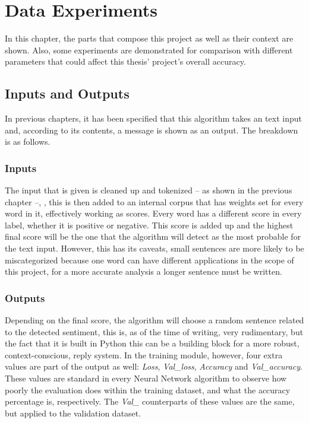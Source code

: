 \chapter{Data Experiments}
In this chapter, the parts that compose this project as well as their context are shown. Also, some experiments are demonstrated for comparison with different parameters that could affect this thesis' project's overall accuracy.

\section{Inputs and Outputs}
In previous chapters, it has been specified that this algorithm takes an text input and, according to its contents, a message is shown as an output. The breakdown is as follows.
\subsection{Inputs}
The input that is given is cleaned up and tokenized -- as shown in the previous chapter --, , this is then added to an internal corpus that has weights set for every word in it, effectively working as scores. Every word has a different score in every label, whether it is positive or negative. This score is added up and the highest final score will be the one that the algorithm will detect as the most probable for the text input. However, this has its caveats, small sentences are more likely to be miscategorized because one word can have different applications in the scope of this project, for a more accurate analysis a longer sentence must be written.
\subsection{Outputs}
Depending on the final score, the algorithm will choose a random sentence related to the detected sentiment, this is, as of the time of writing, very rudimentary, but the fact that it is built in Python this can be a building block for a more robust, context-conscious, reply system.
In the training module, however, four extra values are part of the output as well: \textit{Loss}, \textit{Val\_loss}, \textit{Accuracy} and \textit{Val\_accuracy}.
These values are standard in every Neural Network algorithm to observe how poorly the evaluation does within the training dataset, and what the accuracy percentage is, respectively.
The \textit{Val\_} counterparts of these values are the same, but applied to the validation dataset.

